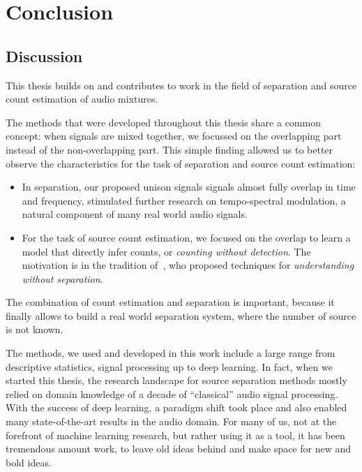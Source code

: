 \chapter{Conclusion}


\section{Discussion}
This thesis builds on and contributes to work in the field of separation and source count estimation of audio mixtures.

The methods that were developed throughout this thesis share a common concept: when signals are mixed together, we focussed on the overlapping part instead of the non-overlapping part. 
This simple finding allowed us to better observe the characteristics for the task of separation and source count estimation:

\begin{itemize}
  \item In separation, our proposed unison signals signals almost fully overlap in time and frequency, stimulated further research on tempo-spectral modulation, a natural component of many real world audio signals.
  \item For the task of source count estimation, we focused on the overlap to learn a model that directly infer counts, or \emph{counting without detection}. The motivation is in the tradition of~\cite{scheirer99}, who proposed techniques for \emph{understanding without separation}.
\end{itemize}

The combination of count estimation and separation is important, because it finally allows to build a real world separation system, where the number of source is not known.

The methods, we used and developed in this work include a large range from descriptive statistics, signal processing up to deep learning.
In fact, when we started this thesis, the research landscape for source separation methods mostly relied on domain knowledge of a decade of “classical” audio signal processing. 
With the success of deep learning, a paradigm shift took place and also  enabled many state-of-the-art results in the audio domain. For many of us, not at the forefront of machine learning research, but rather using it as a tool, it has been tremendous amount work, to leave old ideas behind and make space for new and bold ideas. 

